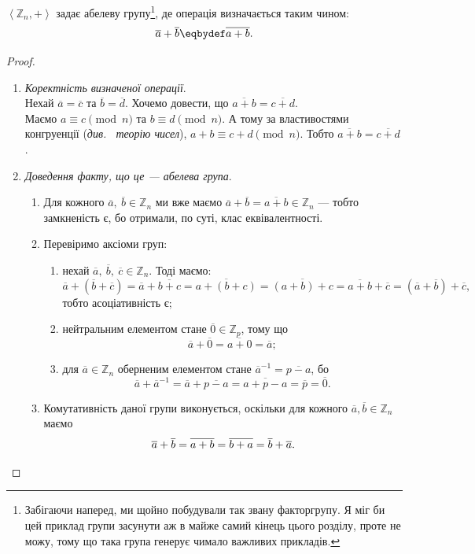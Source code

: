 \documentclass{math_library}
\begin{document}
\begin{theorem}
$\left<\mathbb{Z}_n, + \right>$ задає абелеву групу\footnote{Забігаючи наперед, ми щойно побудували так звану факторгрупу. Я міг би цей приклад групи засунути аж в майже самий кінець цього розділу, проте не можу, тому що така група генерує чимало важливих прикладів.}, де операція визначається таким чином: \[
\overline{a}+\overline{b} \eqbydef \overline{a+b}.
\]
\end{theorem}

\begin{proof}
\begin{enumerate}[topsep=0pt,wide=0pt,label={\Roman*.}]
\item \textit{Коректність визначеної операції}.\\
Нехай $\overline{a} = \overline{c}$ та $\overline{b} = \overline{d}$. Хочемо довести, що $\overline{a+b} = \overline{c+d}$.\\
Маємо $a \equiv c \pmod n$ та $b \equiv d \pmod n$. А тому за властивостями конгруенції (\textit{див.~ теорію чисел}), $a+b \equiv c+d \pmod n$. Тобто $\overline{a+b} = \overline{c+d}$.

\item \textit{Доведення факту, що це --- абелева група}.
\begin{enumerate}[nosep,wide=0pt,label={\roman*.}]
\item Для кожного $\overline{a},\ \overline{b} \in \mathbb{Z}_n$ ми вже маємо $\overline{a}+\overline{b} = \overline{a+b} \in \mathbb{Z}_n$ --- тобто замкненість є, бо отримали, по суті, клас еквівалентності.
\item Перевіримо аксіоми груп:
\begin{enumerate}[nosep,label={\arabic*)}]
\item нехай $\overline{a},\ \overline{b},\ \overline{c} \in \mathbb{Z}_n$. Тоді маємо: \[
\overline{a}+(\overline{b}+\overline{c}) = \overline{a}+\overline{b+c} = \overline{a+(b+c)} = \overline{(a+b)+c} = \overline{a+b} + \overline{c} = (\overline{a}+\overline{b})+\overline{c},\]
тобто асоціативність є;
\item нейтральним елементом стане $\overline{0} \in \mathbb{Z}_p$, тому що 
\[
\overline{a} + \overline{0} = \overline{a+0} = \overline{a};
\]
\item для $\overline{a} \in \mathbb{Z}_n$ оберненим елементом стане $\overline{a}^{-1} = \overline{p-a}$, бо 
\[
\overline{a} + \overline{a}^{-1} = \overline{a} + \overline{p-a} = \overline{a+p-a} = \overline{p} = \overline{0}.
\]
\end{enumerate}
\item Комутативність даної групи виконується, оскільки для кожного $\overline{a},\overline{b} \in \mathbb{Z}_n$ маємо 
\[
 \overline{a} + \overline{b} = \overline{a+b} = \overline{b+a} = \overline{b} + \overline{a}. \qedhere 
 \]
\end{enumerate}
\end{enumerate}
\end{proof}
\end{document}

